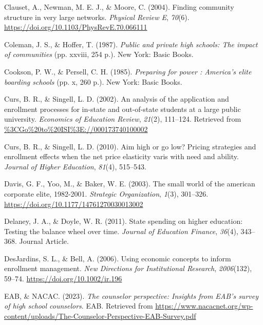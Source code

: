\documentclass[
  12pt,
]{article}
\newlength{\cslhangindent}
\newlength{\cslentryspacingunit} %
\newenvironment{CSLReferences}[2] %
 {%
  \setlength{\parindent}{0pt}
  \ifodd #1
  \let\oldpar\par
  \def\par{\hangindent=\cslhangindent\oldpar}
  \fi
  \setlength{\parskip}{#2\cslentryspacingunit}
 }%
 {}
\begin{document}
\begin{CSLReferences}{1}{0}
\leavevmode{}%
Clauset, A., Newman, M. E. J., \& Moore, C. (2004). Finding community structure in very large networks. \emph{Physical Review E}, \emph{70}(6). \url{https://doi.org/10.1103/PhysRevE.70.066111}

\leavevmode{}%
Coleman, J. S., \& Hoffer, T. (1987). \emph{Public and private high schools: The impact of communities} (pp. xxviii, 254 p.). New York: Basic Books.

\leavevmode{}%
Cookson, P. W., \& Persell, C. H. (1985). \emph{Preparing for power : America's elite boarding schools} (pp. x, 260 p.). New York: Basic Books.

\leavevmode{}%
Curs, B. R., \& Singell, L. D. (2002). An analysis of the application and enrollment processes for in-state and out-of-state students at a large public university. \emph{Economics of Education Review}, \emph{21}(2), 111--124. Retrieved from \url{\%3CGo\%20to\%20ISI\%3E://000173740100002}

\leavevmode{}%
Curs, B. R., \& Singell, L. D. (2010). Aim high or go low? Pricing strategies and enrollment effects when the net price elasticity varis with need and ability. \emph{Journal of Higher Education}, \emph{81}(4), 515--543.

\leavevmode{}%
Davis, G. F., Yoo, M., \& Baker, W. E. (2003). The small world of the american corporate elite, 1982-2001. \emph{Strategic Organization}, \emph{1}(3), 301--326. \url{https://doi.org/10.1177/14761270030013002}

\leavevmode{}%
Delaney, J. A., \& Doyle, W. R. (2011). State spending on higher education: Testing the balance wheel over time. \emph{Journal of Education Finance}, \emph{36}(4), 343--368. Journal Article.

\leavevmode{}%
DesJardins, S. L., \& Bell, A. (2006). Using economic concepts to inform enrollment management. \emph{New Directions for Institutional Research}, \emph{2006}(132), 59--74. \url{https://doi.org/10.1002/ir.196}

\leavevmode{}%
EAB, \& NACAC. (2023). \emph{The counselor perspective: Insights from EAB's survey of high school counselors}. EAB. Retrieved from \url{https://www.nacacnet.org/wp-content/uploads/The-Counselor-Perspective-EAB-Survey.pdf}


\end{CSLReferences}
\end{document}
